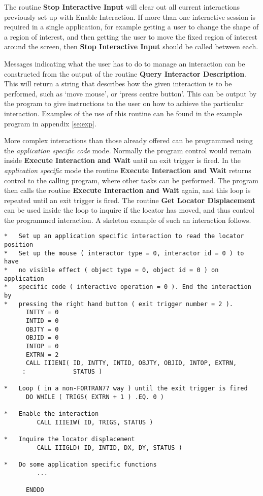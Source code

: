 The routine {\bf Stop Interactive Input} will clear out all current
interactions previously set up with {Enable Interaction}. If more than
one interactive session is required in a single application, for
example getting a user to change the shape of a region of interest,
and then getting the user to move the fixed region of interest around
the screen, then {\bf Stop Interactive Input} should be called between
each.

Messages indicating what the user has to do to manage an interaction
can be constructed from the output of the routine
{\bf Query Interactor Description}. This will return a string that describes
how the given interaction is to be performed, such as `move mouse', or
`press centre button'. This can be output by the program to give
instructions to the user on how to achieve the particular interaction.
Examples of the use of this routine can be found in the example
program in appendix \ref{se:exp}.

More complex interactions than those already offered can be programmed
using the {\it application specific code} mode. Normally the program control
would remain inside {\bf Execute Interaction and Wait} until an exit
trigger is fired. In the {\it application specific} mode the routine
{\bf Execute Interaction and Wait} returns control to the calling program,
where other tasks can be performed. The program then calls the routine
{\bf Execute Interaction and Wait} again, and this loop is repeated until
an exit trigger is fired. The routine {\bf Get Locator Displacement} can
be used inside the loop to inquire if the locator has moved,
and thus control the programmed interaction. A skeleton example of
such an interaction follows.
\begin{small}
\begin{verbatim}
*   Set up an application specific interaction to read the locator position
*   Set up the mouse ( interactor type = 0, interactor id = 0 ) to have
*   no visible effect ( object type = 0, object id = 0 ) on application
*   specific code ( interactive operation = 0 ). End the interaction by
*   pressing the right hand button ( exit trigger number = 2 ).
      INTTY = 0
      INTID = 0
      OBJTY = 0
      OBJID = 0
      INTOP = 0
      EXTRN = 2
      CALL IIIENI( ID, INTTY, INTID, OBJTY, OBJID, INTOP, EXTRN,
     :             STATUS )

*   Loop ( in a non-FORTRAN77 way ) until the exit trigger is fired
      DO WHILE ( TRIGS( EXTRN + 1 ) .EQ. 0 )

*   Enable the interaction
         CALL IIIEIW( ID, TRIGS, STATUS )

*   Inquire the locator displacement
         CALL IIIGLD( ID, INTID, DX, DY, STATUS )

*   Do some application specific functions
         ...

      ENDDO
\end{verbatim}
\end{small}

